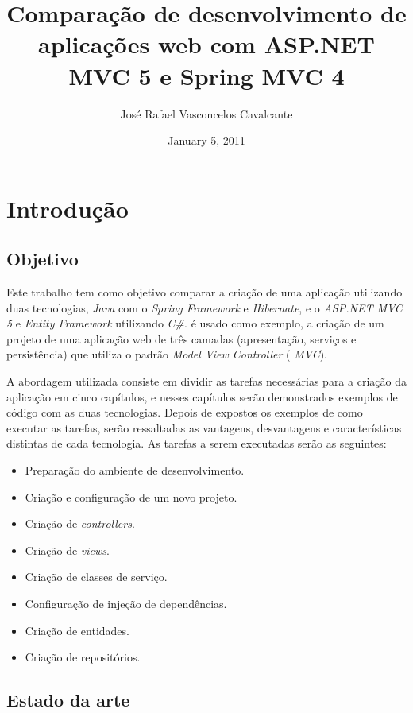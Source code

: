 \documentclass[a4paper,12pt]{article}
\newcommand{\est}[1] {
\textit{#1}}
\newcommand{\sigla}[1] {
\textit{#1}}
\newcommand{\lang}[1] {
\textit{#1}}
\newcommand{\lib}[1] {
\textit{#1}}
\begin{document}
\title{Comparação de desenvolvimento de aplicações web com ASP.NET MVC 5 e Spring MVC 4}
\author{José Rafael Vasconcelos Cavalcante}
\date{January 5, 2011}
\maketitle

\newpage
\section{Introdução}

\subsection{Objetivo}

Este trabalho tem como objetivo comparar a criação de uma aplicação utilizando duas tecnologias, \textit{Java} com o \lib{Spring Framework} e \lib{Hibernate}, e o \sigla{ASP.NET MVC 5} e \textit{Entity Framework} utilizando \lang{C\#}. é usado como exemplo, a criação de um projeto de uma aplicação web de três camadas (apresentação, serviços e persistência) que utiliza o padrão \est{Model View Controller} (\sigla{MVC}).

A abordagem utilizada consiste em dividir as tarefas necessárias para a criação da aplicação em cinco capítulos, e nesses capítulos serão demonstrados exemplos de código com as duas tecnologias. Depois de expostos os exemplos de como executar as tarefas, serão ressaltadas as vantagens, desvantagens e características distintas de cada tecnologia. As tarefas a serem executadas serão as seguintes:

\begin{itemize}
  \item Preparação do ambiente de desenvolvimento.
  \item Criação e configuração de um novo projeto.
  \item Criação de \est{controllers}.
  \item Criação de \est{views}.
  \item Criação de classes de serviço.
  \item Configuração de injeção de dependências.
  \item Criação de entidades.
  \item Criação de repositórios.
\end{itemize}

\subsection{Estado da arte}
 
\end{document}
